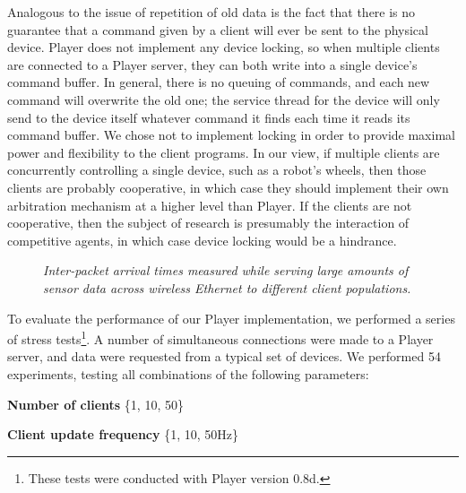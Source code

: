 Analogous to the issue of repetition of old data is the fact that there
is no guarantee that a command given by a client will ever be sent to
the physical device.  Player does not implement any device
locking, so when multiple clients are connected to 
a Player server, they can both write into 
a single device's command buffer.  In general, there is no queuing of 
commands, and each new command will overwrite the old one; 
the service thread for the device will only send to the device itself 
whatever command it finds each time it reads its command buffer.  We
chose not to implement locking in order to provide maximal power and
flexibility to the client programs.  In our view, if multiple
clients are concurrently controlling a single device, such as a robot's
wheels, then those clients are probably cooperative, in which case they
should implement their own arbitration mechanism at a higher level than
Player.  If the clients are not cooperative, then the subject of research
is presumably the interaction of competitive agents, in which case device
locking would be a hindrance.



\label{section:results}
\begin{figure}
\begin{center} 
 \caption{{\sl Inter-packet arrival times measured while serving
          large amounts of sensor data across wireless Ethernet
          to different client populations.}}
  \label{figure:graphs}
\end{center}
\end{figure}
To evaluate the performance of our Player implementation, we performed
a series of stress tests\footnote{These tests were conducted with
Player version 0.8d.}. A number of simultaneous connections were
made to a Player server, and data were requested from a typical set of
devices. We performed 54 experiments, testing all combinations of the
following parameters:

{\bf Number of clients} \{1, 10, 50\}

{\bf Client update frequency} \{1, 10, 50Hz\}

